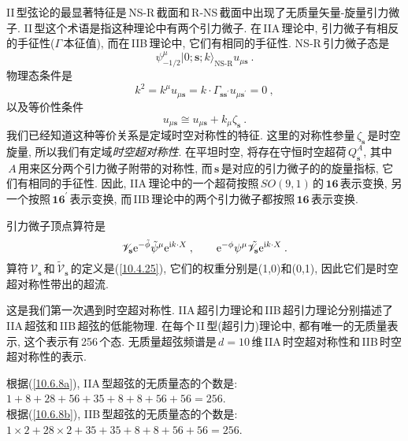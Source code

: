 II\,型弦论的最显著特征是\,NS-R\,截面和\,R-NS\,截面中出现了无质量矢量-旋量引力微子. II\,型这个术语是指这种理论中有两个引力微子. 在\,IIA\,理论中, 引力微子有相反的手征性($\Gamma$\,本征值), 而在\,IIB\,理论中, 它们有相同的手征性. NS-R\,引力微子态是
\begin{equation}
    \psi_{-1/2}^{\mu}\lvert 0;\mathbf{s};k\rangle_{\text{NS-R}} u_{\mu\mathbf{s}} \:. \label{10.6.12}
\end{equation}
物理态条件是
\begin{equation}
    k^{2}=k^{\mu}u_{\mu\mathbf{s}}=k\cdot \Gamma_{\mathbf{s}\mathbf{s}^{\prime}}u_{\mu\mathbf{s}^{\prime}}=0\:,\label{10.6.13}
\end{equation}
以及等价性条件
\begin{equation}
    u_{\mu\mathbf{s}} \cong u_{\mu\mathbf{s}} + k_{\mu}\zeta_{\mathbf{s}} \:. \label{10.6.14}
\end{equation}
我们已经知道这种等价关系是定域时空对称性的特征. 这里的对称性参量$\,\zeta_{\mathbf{s}}\,$是时空旋量, 所以我们有定域{\emph{时空超对称性}}. 在平坦时空, 将存在守恒时空超荷$\,Q_{\mathbf{s}}^{A}$, 其中$\,A\,$用来区分两个引力微子附带的对称性, 而$\,\mathbf{s}\,$是对应的引力微子的的旋量指标, 它们有相同的手征性. 因此, IIA\,理论中的一个超荷按照$\,SO(9,1)\,$的$\,\mathbf{16}\,$表示变换, 另一个按照$\,\mathbf{16}^{\prime}\,$表示变换, 而\,IIB\,理论中的两个引力微子都按照$\,\mathbf{16}\,$表示变换.

引力微子顶点算符是
\begin{equation}
    \mathscr{V}_{\mathbf{s}}\mathrm{e}^{-\tilde{\phi}}\tilde{\psi}^{\mu}\mathrm{e}^{\mathrm{i} k\cdot X} \:, \qquad
    \mathrm{e}^{-\phi}\psi^{\mu} \tilde{\mathscr{V}}_{\mathbf{s}}\mathrm{e}^{\mathrm{i} k\cdot X} \:. \label{10.6.15}
\end{equation}
算符$\,\mathscr{V}_{\mathbf{s}}\,$和$\,\tilde{\mathscr{V}}_{\mathbf{s}}\,$的定义是(\ref{10.4.25}), 它们的权重分别是(1,0)和(0,1), 因此它们是时空超对称性带出的超流.

这是我们第一次遇到时空超对称性. IIA\,超引力理论和\,IIB\,超引力理论分别描述了\,IIA\,超弦和\,IIB\,超弦的低能物理. 在每个\,II\,型(超引力)理论中, 都有唯一的无质量表示, 这个表示有\,256\,个态. 无质量超弦频谱是\,$d=10$\,维\,IIA\,时空超对称性和\,IIB\,时空超对称性的表示.
\begin{tcolorbox}
根据(\ref{10.6.8a}), IIA\,型超弦的无质量态的个数是: $1+8+28+56+35+8+8+56+56=256$.\\
根据(\ref{10.6.8b}), IIB\,型超弦的无质量态的个数是: $1\times2+28\times 2+35+35+8+8+56+56=256$.
\end{tcolorbox}

